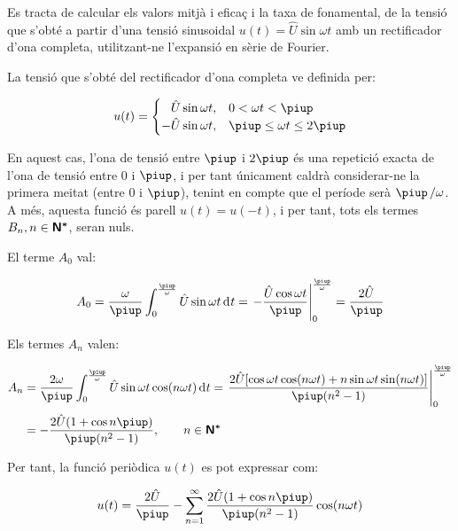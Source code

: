 \begin{exemple}
    Es tracta de calcular els valors mitjà i eficaç i la taxa de
    fonamental, de la tensió que s'obté a partir d'una tensió
    sinusoidal $u(t) = \hat{U} \sin\omega t$ amb un rectificador d'ona
    completa, utilitzant-ne l'expansió en sèrie de Fourier.

    La tensió que s'obté del rectificador d'ona completa ve definida
    per:

    \[
    u(t) = \begin{cases} \phantom{-}\hat{U} \sin\omega t, & 0 < \omega t < \piup\\
           -\hat{U} \sin\omega t, & \piup \leq \omega t \leq 2\piup \end{cases}
    \]

    En aquest cas, l'ona de tensió entre $\piup$ i $2\piup$ és una repetició
    exacta de l'ona de tensió entre 0 i $\piup$, i per tant únicament
    caldrà considerar-ne la primera meitat (entre 0 i $\piup$), tenint en
    compte que el període serà $\piup\,/\omega$. A més, aquesta funció és
    parell $u(t) = u(-t)$, i per tant, tots els termes
    $B_n, n \in {\ensuremath{\boldsymbol{\mathsf{N^*}}}}$, seran nuls.

    El terme $A_0$ val:

    \[
    A_0 = \frac{\omega}{\piup} \int_0^{\frac{\piup}{\omega}} \hat{U} \sin
    \omega t \diff t = \left. -\frac{\hat{U} \cos \omega t}{\piup}
    \right|_0^{\frac{\piup}{\omega}} = \frac{2\hat{U}}{\piup}
    \]

    Els termes $A_n$ valen:

    \[
    \begin{split}
    A_n &= \frac{2 \omega}{\piup} \int_0^{\frac{\piup}{\omega}} \hat{U} \sin
    \omega t \cos(n \omega t)\diff t = \left. \frac{2 \hat{U}[ \cos
    \omega t \cos (n \omega t) + n \sin \omega t \sin(n \omega
    t)]}{\piup(n^2-1)} \right|_0^{\frac{\piup}{\omega}}\\[0.5ex]
    &= -\frac{2\hat{U}(1+\cos n \piup)}{\piup(n^2-1)},
    \qquad n \in \mathsfb{N^*}
    \end{split}
    \]

    Per tant, la funció periòdica $u(t)$ es pot expressar com:

    \[
        u(t) = \frac{2\hat{U}}{\piup} - \sum_{n=1}^\infty
         \frac{2\hat{U}(1+\cos n \piup)}{\piup(n^2-1)} \cos(n \omega t)
    \]


\end{exemple}
